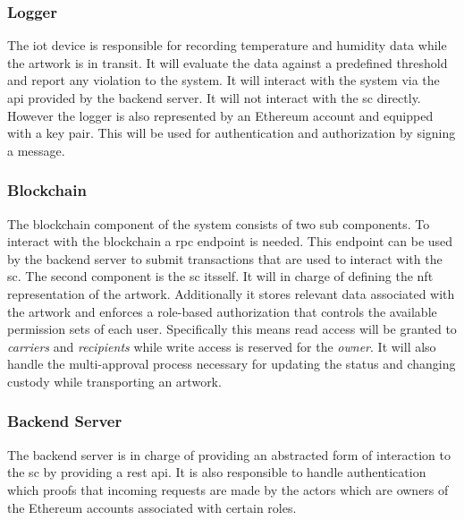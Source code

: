 \subsubsection{Logger}
The \gls{iot} device is responsible for recording temperature and humidity data while the artwork is in transit. It will evaluate the data against a predefined threshold and report any violation to the system. It will interact with the system via the \gls{api} provided by the backend server. It will not interact with the \gls{sc} directly. However the logger is also represented by an Ethereum account and equipped with a key pair. This will be used for authentication and authorization by signing a message.

\subsubsection{Blockchain}
The blockchain component of the system consists of two sub components. To interact with the blockchain a \gls{rpc} endpoint is needed. This endpoint can be used by the backend server to submit transactions that are used to interact with the \gls{sc}. The second component is the \gls{sc} itsself. It will in charge of defining the \gls{nft} representation of the artwork. Additionally it stores relevant data associated with the artwork and enforces a role-based authorization that controls the available permission sets of each user. Specifically this means read access will be granted to \textit{carriers} and \textit{recipients} while write access is reserved for the \textit{owner}. It will also handle the multi-approval process necessary for updating the status and changing custody while transporting an artwork.

\subsubsection{Backend Server}
The backend server is in charge of providing an abstracted form of interaction to the \gls{sc} by providing a \gls{rest} \gls{api}. It is also responsible to handle authentication which proofs that incoming requests are made by the actors which are owners of the Ethereum accounts associated with certain roles. 

